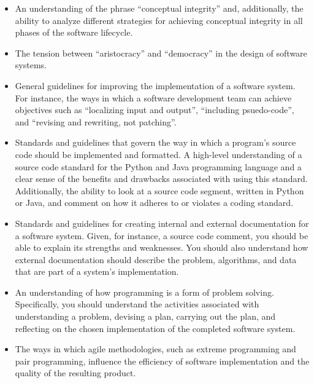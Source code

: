 \documentclass[11pt]{article}
\begin{document}
\begin{itemize}
  \item An understanding of the phrase ``conceptual integrity'' and,
    additionally, the ability to analyze different strategies for achieving
    conceptual integrity in all phases of the software lifecycle.

  \item The tension between ``aristocracy'' and ``democracy'' in the design of
    software systems.

  \item General guidelines for improving the implementation of a software
    system. For instance, the ways in which a software development team can
    achieve objectives such as ``localizing input and output'', ``including
    psuedo-code'', and ``revising and rewriting, not patching''.

  \item Standards and guidelines that govern the way in which a program's source
    code should be implemented and formatted. A high-level understanding of a
    source code standard for the Python and Java programming language and a
    clear sense of the benefits and drawbacks associated with using this
    standard. Additionally, the ability to look at a source code segment,
    written in Python or Java, and comment on how it adheres to or violates a
    coding standard.

  \item Standards and guidelines for creating internal and external
    documentation for a software system. Given, for instance, a source code
    comment, you should be able to explain its strengths and weaknesses. You
    should also understand how external documentation should describe the
    problem, algorithms, and data that are part of a system's implementation.

  \item An understanding of how programming is a form of problem solving.
    Specifically, you should understand the activities associated with
    understanding a problem, devising a plan, carrying out the plan, and
    reflecting on the chosen implementation of the completed software system.

  \item The ways in which agile methodologies, such as extreme programming and
    pair programming, influence the efficiency of software implementation and
    the quality of the resulting product.

\end{itemize}
\end{document}
